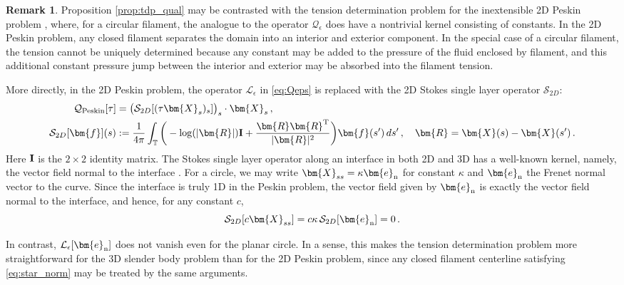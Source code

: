 \documentclass[11pt,reqno]{amsart}
\newcommand{\T}{\mathbb{T}}
\newcommand{\bR}{\bm{R}}
\newcommand{\X}{\bm{X}}
\newcommand{\be}{\bm{e}}
\newcommand{\abs}[1]{\left\lvert #1 \right\rvert}
\newcommand{\mc}[1]{\mathcal{#1}}
\theoremstyle{definition}
\newtheorem{remark}{Remark}
\begin{document}
\begin{remark}\label{rem:Peskin_TDP}
Proposition \ref{prop:tdp_qual} may be contrasted with the tension determination problem for the inextensible 2D Peskin problem \cite{kuo2023tension}, where, for a circular filament, the analogue to the operator $\mc{Q}_\epsilon$ does have a nontrivial kernel consisting of constants. 
In the 2D Peskin problem, any closed filament separates the domain into an interior and exterior component. In the special case of a circular filament, the tension cannot be uniquely determined because any constant may be added to the pressure of the fluid enclosed by filament, and this additional constant pressure jump between the interior and exterior may be absorbed into the filament tension.  

More directly, in the 2D Peskin problem, the operator $\mc{L}_\epsilon$ in \eqref{eq:Qeps} is replaced with the 2D Stokes single layer operator $\mc{S}_{2D}$: 
\begin{equation}
\begin{aligned}
\mc{Q}_{\rm Peskin}[\tau] &=  \big(\mc{S}_{2D}[(\tau\X_s)_s]\big)_s\cdot\X_s\,, \\
\mc{S}_{2D}[\bm{f}](s) &:= \frac{1}{4\pi}\int_{\T}\bigg(-\log(\abs{\bR}){\bf I}+\frac{\bR\bR^{\rm T}}{|\bR|^2}\bigg)\bm{f}(s')\,ds'\,, \quad \bR = \X(s)-\X(s')\,.
\end{aligned}
\end{equation} 
Here ${\bf I}$ is the $2\times2$ identity matrix.
The Stokes single layer operator along an interface in both 2D and 3D has a well-known kernel, namely, the vector field normal to the interface \cite{pozrikidis1992boundary}.
%
For a circle, we may write $\X_{ss}=\kappa\be_{\rm n}$ for constant $\kappa$ and $\be_{\rm n}$ the Frenet normal vector to the curve. Since the interface is truly 1D in the Peskin problem, the vector field given by $\be_{\rm n}$ is exactly the vector field normal to the interface, and hence, for any constant $c$, 
\begin{equation}
\mc{S}_{2D}[c\X_{ss}] = c\kappa\,\mc{S}_{2D}[\be_{\rm n}] = 0\,.
\end{equation}


In contrast, $\mc{L}_\epsilon[\be_{\rm n}]$ does not vanish even for the planar circle. In a sense, this makes the tension determination problem more straightforward for the 3D slender body problem than for the 2D Peskin problem, since any closed filament centerline satisfying \eqref{eq:star_norm} may be treated by the same arguments. 
\end{remark}
\end{document}
